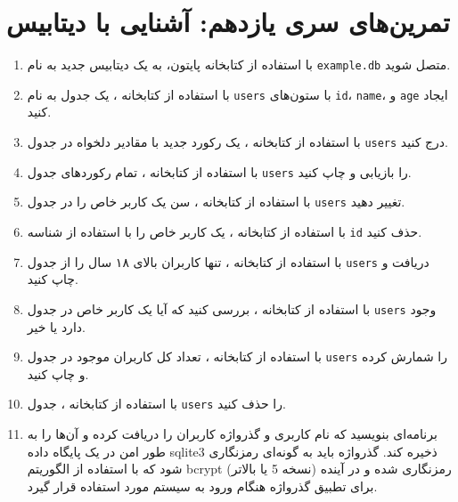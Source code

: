 \documentclass[b5paper,12pt]{article}
\begin{document}
	\newpage
	\section*{تمرین‌های سری یازدهم: آشنایی با دیتابیس}
	
	\begin{enumerate}
		\item با استفاده از کتابخانه  پایتون، به یک دیتابیس جدید به نام \texttt{example.db} متصل شوید.
		\item با استفاده از کتابخانه ، یک جدول به نام \texttt{users} با ستون‌های \texttt{id}، \texttt{name}، و \texttt{age} ایجاد کنید.
		\item با استفاده از کتابخانه ، یک رکورد جدید با مقادیر دلخواه در جدول \texttt{users} درج کنید.
		\item با استفاده از کتابخانه ، تمام رکوردهای جدول \texttt{users} را بازیابی و چاپ کنید.
		\item با استفاده از کتابخانه ، سن یک کاربر خاص را در جدول \texttt{users} تغییر دهید.
		\item با استفاده از کتابخانه ، یک کاربر خاص را با استفاده از شناسه \texttt{id} حذف کنید.
		\item با استفاده از کتابخانه ، تنها کاربران بالای ۱۸ سال را از جدول \texttt{users} دریافت و چاپ کنید.
		\item با استفاده از کتابخانه ، بررسی کنید که آیا یک کاربر خاص در جدول \texttt{users} وجود دارد یا خیر.
		\item با استفاده از کتابخانه ، تعداد کل کاربران موجود در جدول \texttt{users} را شمارش کرده و چاپ کنید.
		\item با استفاده از کتابخانه ، جدول \texttt{users} را حذف کنید.
		\item برنامه‌ای بنویسید که نام کاربری و گذرواژه کاربران را دریافت کرده و آن‌ها را به طور امن در یک پایگاه داده sqlite3 ذخیره کند. گذرواژه باید به گونه‌ای رمزنگاری شود که با استفاده از الگوریتم bcrypt (نسخه 5 یا بالاتر) رمزنگاری شده و در آینده برای تطبیق گذرواژه هنگام ورود به سیستم مورد استفاده قرار گیرد.
	\end{enumerate}

	\newpage
\end{document}
